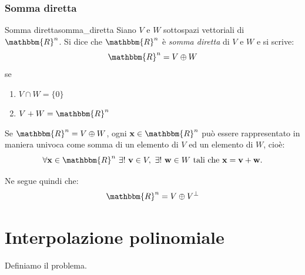 \documentclass[12pt]{report}
\newcounter{definition}
\newcounter{proposition}
\newcommand{\nmu}{}
\begin{document}
\subsection{Somma diretta}
\begin{definition}{\nmu Somma diretta}{somma_diretta}
	Siano $V$ e $W$ sottospazi vettoriali di $\mathbbm{R}^n$. Si dice che $\mathbbm{R}^n$ è \textit{somma diretta} di $V$ e $W$ e si scrive:
	\[
	\mathbbm{R}^n = V \oplus W
	\]
	se
	\begin{enumerate}
		\item $V \cap W = \{0\}$
		\item $V + W = \mathbbm{R}^n$
	\end{enumerate}
\end{definition}
\begin{proposition}{}{}
Se $\mathbbm{R}^n = V \oplus W$, ogni $\mathbf{x} \in \mathbbm{R}^n$ può essere rappresentato in maniera univoca come somma di un elemento di $V$ ed un elemento di $W$, cioè:
\[
\forall \mathbf{x} \in \mathbbm{R}^n\ \exists!\ \mathbf{v} \in V,\ \exists!\ \mathbf{w} \in W \text{ tali che } \mathbf{x} = \mathbf{v} + \mathbf{w}.
\]
\end{proposition}
Ne segue quindi che:
\[
\mathbbm{R}^n = V \oplus V^\perp
\]
\chapter{Interpolazione polinomiale}
Definiamo il problema.
\end{document}
